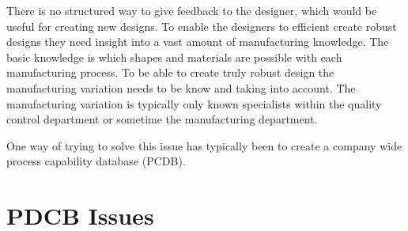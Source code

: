 \documentclass[aip,amsmath,reprint, author-year]{revtex4-1}
\begin{document}
 

 
There is no structured way to give feedback to the designer, which would be useful for creating new designs. 
To enable the designers to efficient create robust designs they need insight into a vast amount of manufacturing knowledge. 
The basic knowledge is which shapes and materials are possible with each manufacturing process. 
To be able to create truly robust design the manufacturing variation needs to be know and taking into account. The manufacturing variation is typically only known specialists within the quality control department or sometime the manufacturing department. 



One way of trying to solve this issue has typically been to create a company wide process capability database (PCDB). 

\section{PDCB Issues}
\end{document}
